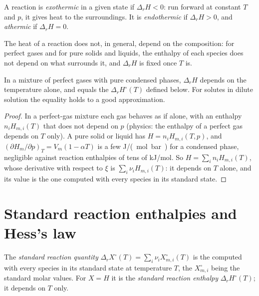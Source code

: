 \begin{definition}\label{def:b2:reaction-enthalpy:exothermic}
A reaction is \emph{exothermic} in a given state if
$\Delta_r H < 0$: run forward at constant $T$ and $p$, it gives heat to the
surroundings. It is \emph{endothermic} if $\Delta_r H >
0$, and \emph{athermic} if $\Delta_r H = 0$.
\end{definition}

The heat of a reaction does not, in general, depend on the composition:
for perfect gases and for pure solids and liquids, the enthalpy of each
species does not depend on what surrounds it, and $\Delta_r H$ is fixed
once $T$ is.

\begin{proposition}\label{prop:b2:reaction-enthalpy:ideal}
In a mixture of perfect gases with pure condensed phases, $\Delta_r H$
depends on the temperature alone, and equals the  $\Delta_r H^\circ(T)$ defined below. For solutes in dilute
solution the equality holds to a good approximation.
\end{proposition}

\begin{proof}
In a perfect-gas mixture each gas behaves as if alone, with an enthalpy
$n_iH_{m,i}(T)$ that does not depend on $p$ (physics: the enthalpy of a
perfect gas depends on $T$ only). A pure solid or liquid has $H = n_iH_{m,i}(T,
p)$, and $(\partial H_m/\partial p)_T = V_m(1 - \alpha T)$ is a few
\unit{J/(mol.bar)} for a condensed phase, negligible against reaction
enthalpies of tens of \unit{kJ/mol}. So $H = \sum_in_iH_{m,i}(T)$, whose
derivative with respect to $\xi$ is $\sum_i\nu_iH_{m,i}(T)$: it depends on
$T$ alone, and its value is the one computed with every species in its
standard state.
\end{proof}

\section{Standard reaction enthalpies and Hess's law}

\begin{definition}\label{def:b2:reaction-enthalpy:standard-reaction-enthalpy}
The \emph{standard reaction quantity}
$\Delta_r X^\circ(T) = \sum_i\nu_iX_{m,i}^\circ(T)$ is the 
computed with every species in its standard state at temperature $T$, the
$X_{m,i}^\circ$ being the standard molar values. For $X = H$ it is the
\emph{standard reaction enthalpy}
$\Delta_r H^\circ(T)$; it depends on $T$ only.
\end{definition}

